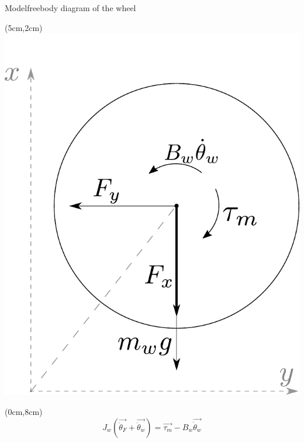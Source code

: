 \begin{frame}{Model}{freebody diagram of the wheel}
	\begin{textblock*}{15cm}(5cm,2cm)
		\includegraphics[scale=0.40]{Pictures/freeBodyWheel.pdf}
	\end{textblock*}
	
	\begin{textblock*}{15cm}(0cm,8cm)
	\begin{displaymath}	
	  \si{ J_w (\vec{\ddot{\theta}_F} + \vec{\ddot{\theta}_w}) =} 
	  \si{ \vec{\tau_m} - B_w \vec{\dot{\theta}_w }}
	\end{displaymath}
	\end{textblock*}
\end{frame}


